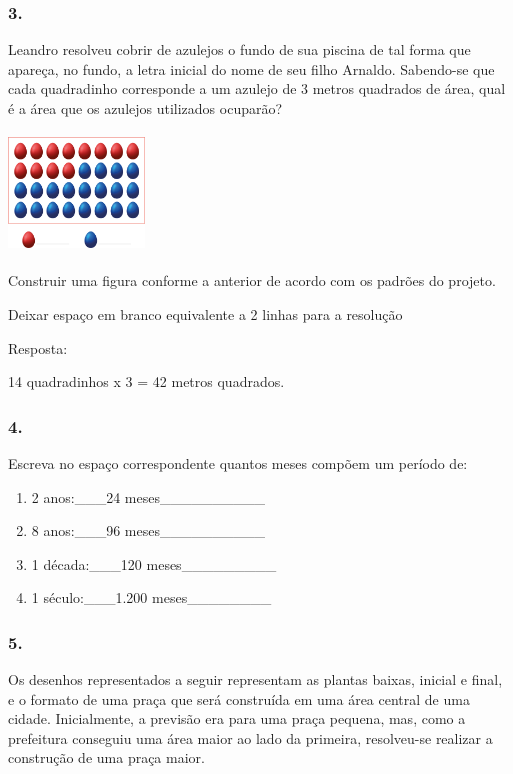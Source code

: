\begin{enumerate}
\begin{escolha}
\begin{enumerate}
\begin{itemize}
\begin{itemize}
\begin{escolha}
\subsubsection{3.}\label{section-54}

Leandro resolveu cobrir de azulejos o fundo de sua piscina de tal forma
que apareça, no fundo, a letra inicial do nome de seu filho Arnaldo.
Sabendo-se que cada quadradinho corresponde a um azulejo de 3 metros
quadrados de área, qual é a área que os azulejos utilizados
ocuparão?

\includegraphics[width=1.42949in,height=1.25160in]{media/image63.png}

Construir uma figura conforme a anterior de acordo com os padrões do
projeto.

Deixar espaço em branco equivalente a 2 linhas para a resolução

Resposta:

14 quadradinhos x 3 = 42 metros quadrados.

\subsubsection{4.}\label{section-55}

Escreva no espaço correspondente quantos meses compõem um período de:

\begin{enumerate}
\def\labelenumi{\alph{enumi})}
\item
  2 anos:­­­­­­­­­­­­­­­­­­­\_\_\_24 meses\_\_\_\_\_\_\_\_\_\_
\item
  8 anos:\_\_\_96 meses\_\_\_\_\_\_\_\_\_\_
\item
  1 década:\_\_\_120 meses\_\_\_\_\_\_\_\_\_
\item
  1 século:\_\_\_1.200 meses\_\_\_\_\_\_\_\_
\end{enumerate}

\subsubsection{5.}\label{section-56}

Os desenhos representados a seguir representam as plantas baixas, inicial
e final, e o formato de uma praça que será construída em uma área
central de uma cidade. Inicialmente, a previsão era para uma praça
pequena, mas, como a prefeitura conseguiu uma área maior ao lado da
primeira, resolveu-se realizar a construção de uma praça maior.


\end{escolha}
\end{itemize}
\end{itemize}
\end{enumerate}
\end{escolha}
\end{enumerate}
